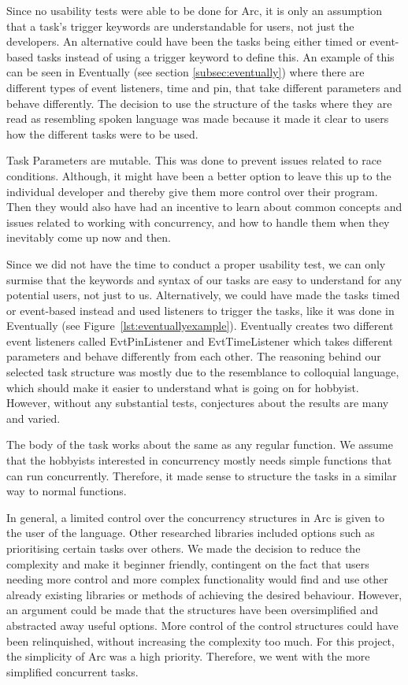 Since no usability tests were able to be done for Arc, it is only an assumption that a task's trigger keywords are understandable for users, not just the developers. An alternative could have been the tasks being either timed or event-based tasks instead of using a trigger keyword to define this. An example of this can be seen in Eventually (see section \ref{subsec:eventually}) where there are different types of event listeners, time and pin, that take different parameters and behave differently. The decision to use the structure of the tasks where they are read as resembling spoken language was made because it made it clear to users how the different tasks were to be used.


Task Parameters are mutable. This was done to prevent issues related to race conditions. Although, it might have been a better option to leave this up to the individual developer and thereby give them more control over their program. Then they would also have had an incentive to learn about common concepts and issues related to working with concurrency, and how to handle them when they inevitably come up now and then.

Since we did not have the time to conduct a proper usability test, we can only surmise that the keywords and syntax of our tasks are easy to understand for any potential users, not just to us. Alternatively, we could have made the tasks timed or event-based instead and used listeners to trigger the tasks, like it was done in Eventually (see Figure~\ref{lst:eventuallyexample}). Eventually creates two different event listeners called EvtPinListener and EvtTimeListener which takes different parameters and behave differently from each other. The reasoning behind our selected task structure was mostly due to the resemblance to colloquial language, which should make it easier to understand what is going on for hobbyist. However, without any substantial tests, conjectures about the results are many and varied.

The body of the task works about the same as any regular function. We assume that the hobbyists interested in concurrency mostly needs simple functions that can run concurrently. Therefore, it made sense to structure the tasks in a similar way to normal functions.

In general, a limited control over the concurrency structures in Arc is given to the user of the language. Other researched libraries included options such as prioritising certain tasks over others. We made the decision to reduce the complexity and make it beginner friendly, contingent on the fact that users needing more control and more complex functionality would find and use other already existing libraries or methods of achieving the desired behaviour. However, an argument could be made that the structures have been oversimplified and abstracted away useful options. More control of the control structures could have been relinquished, without increasing the complexity too much. For this project, the simplicity of Arc was a high priority. Therefore, we went with the more simplified concurrent tasks.

